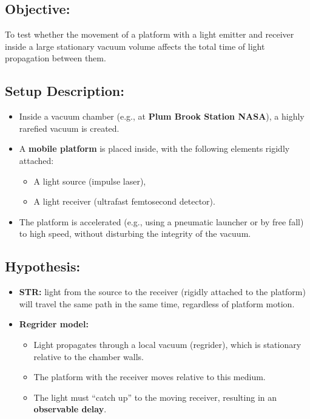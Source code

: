 \documentclass[12pt]{article}
\begin{document}
\subsection*{Objective:}
To test whether the movement of a platform with a light emitter and receiver inside a large stationary vacuum volume affects the total time of light propagation between them.

\subsection*{Setup Description:}
\begin{itemize}
    \item Inside a vacuum chamber (e.g., at \textbf{Plum Brook Station NASA}), a highly rarefied vacuum is created.
    \item A \textbf{mobile platform} is placed inside, with the following elements rigidly attached:
    \begin{itemize}
        \item A light source (impulse laser),
        \item A light receiver (ultrafast femtosecond detector).
    \end{itemize}
    \item The platform is accelerated (e.g., using a pneumatic launcher or by free fall) to high speed, without disturbing the integrity of the vacuum.
\end{itemize}

\subsection*{Hypothesis:}
\begin{itemize}
    \item \textbf{STR:} light from the source to the receiver (rigidly attached to the platform) will travel the same path in the same time, regardless of platform motion.
    \item \textbf{Regrider model:}
    \begin{itemize}
        \item Light propagates through a local vacuum (regrider), which is stationary relative to the chamber walls.
        \item The platform with the receiver moves relative to this medium.
        \item The light must “catch up” to the moving receiver, resulting in an \textbf{observable delay}.
    \end{itemize}
\end{itemize}
\end{document}
